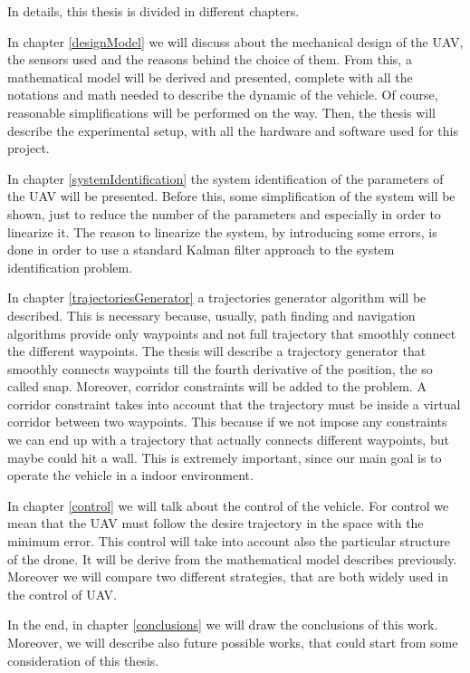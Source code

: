 \noindent In details, this thesis is divided in different chapters.

\noindent In chapter \ref{designModel} we will discuss about the mechanical design of the UAV, the sensors used and the reasons behind the choice of them. From this, a mathematical model will be derived and presented, complete with all the notations and math needed to describe the dynamic of the vehicle. Of course, reasonable simplifications will be performed on the way. Then, the thesis will describe the experimental setup, with all the hardware and software used for this project.

\noindent In chapter \ref{systemIdentification} the system identification of the parameters of the UAV will be presented. Before this, some simplification of the system will be shown, just to reduce the number of the parameters and especially in order to linearize it. The reason to linearize the system, by introducing some errors, is done in order to use a standard Kalman filter approach to the system identification problem. 

\noindent In chapter \ref{trajectoriesGenerator} a trajectories generator algorithm will be described. This is necessary because, usually, path finding and navigation algorithms provide only waypoints and not full trajectory that smoothly connect the different waypoints. The thesis will describe a trajectory generator that smoothly connects waypoints till the fourth derivative of the position, the so called snap. Moreover, corridor constraints will be added to the problem. A corridor constraint takes into account that the trajectory must be inside a virtual corridor between two waypoints. This because if we not impose any constraints we can end up with a trajectory that actually connects different waypoints, but maybe could hit a wall. This is extremely important, since our main goal is to operate the vehicle in a indoor environment. 

\noindent In chapter \ref{control} we will talk about the control of the vehicle. For control we mean that the UAV must follow the desire trajectory in the space with the minimum error. This control will take into account also the particular structure of the drone. It will be derive from the mathematical model describes previously. Moreover we will compare two different strategies, that are both widely used in the control of UAV.

\noindent In the end, in chapter \ref{conclusions} we will draw the conclusions of this work. Moreover, we will describe also future possible works, that could start from some consideration of this thesis. 
